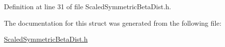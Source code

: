 Definition at line 31 of file Scaled\+Symmetric\+Beta\+Dist.\+h.



The documentation for this struct was generated from the following file\+:\begin{DoxyCompactItemize}
\item 
\hyperlink{ScaledSymmetricBetaDist_8h}{Scaled\+Symmetric\+Beta\+Dist.\+h}\end{DoxyCompactItemize}
